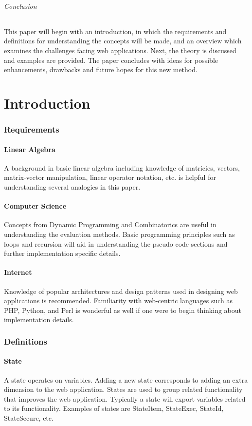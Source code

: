 \documentclass[11pt,twocolumn]{article}
\begin{document}
\paragraph{Conclusion}
This paper will begin with an introduction, in which the requirements and definitions for understanding the concepts will be made, and an overview which examines the challenges facing web applications. Next, the theory is discussed and examples are provided. The paper concludes with ideas for possible enhancements, drawbacks and future hopes for this new method.

\newpage
\tableofcontents

\newpage
\part{Introduction}

\section{Requirements}
\subsection{Linear Algebra}
A background in basic linear algebra including knowledge of matricies, vectors, matrix-vector manipulation, linear operator notation, etc. is helpful for understanding several analogies in this paper. 
\subsection{Computer Science}
Concepts from Dynamic Programming and Combinatorics are useful in understanding the evaluation methods. Basic programming principles such as loops and recursion will aid in understanding the pseudo code sections and further implementation specific details.
\subsection{Internet}
Knowledge of popular architectures and design patterns used in designing web applications is recommended. Familiarity with web-centric languages such as PHP, Python, and Perl is wonderful as well if one were to begin thinking about implementation details.

\section{Definitions}
\subsection{State}
A state operates on variables. Adding a new state corresponds to adding an extra dimension to the web application. States are used to group related functionality that improves the web application. Typically a state will export variables related to its functionality. Examples of states are StateItem, StateExec, StateId, StateSecure, etc.
\end{document}
